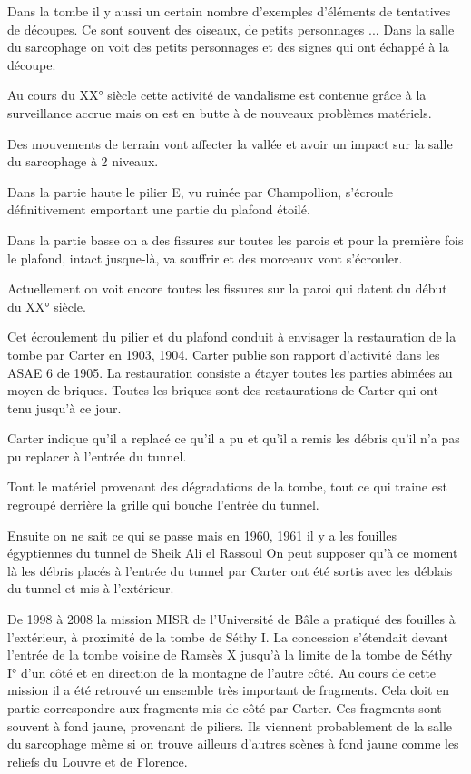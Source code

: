 \documentclass{article}
\begin{document}
Dans la tombe il y aussi un certain nombre d’exemples d’éléments de
tentatives de découpes. Ce sont souvent des oiseaux, de petits
personnages ... Dans la salle du sarcophage on voit des petits
personnages et des signes qui ont échappé à la découpe. 

Au cours du XX° siècle cette activité de vandalisme est contenue grâce à
la surveillance accrue mais on est en butte à de nouveaux problèmes
matériels.

Des mouvements de terrain vont affecter la vallée et avoir un impact sur
la salle du sarcophage à 2 niveaux. 

Dans la partie haute le pilier E, vu ruinée par Champollion, s’écroule
définitivement emportant une partie du plafond étoilé.

Dans la partie basse on a des fissures sur toutes les parois et pour la
première fois le plafond, intact jusque-là, va souffrir et des morceaux
vont s’écrouler.

Actuellement on voit encore toutes les fissures sur la paroi qui datent
du début du XX° siècle. 

Cet écroulement du pilier et du plafond conduit à envisager la
restauration de la tombe par Carter en 1903, 1904.  Carter publie son
rapport d’activité dans les ASAE 6  de 1905. La restauration consiste a
étayer toutes les parties abimées au moyen de briques. Toutes les
briques sont des restaurations de Carter qui ont tenu jusqu’à ce jour.

Carter indique qu’il a replacé ce qu’il a pu et qu’il a remis les débris
qu’il n’a pas pu replacer à l’entrée du tunnel.

Tout le matériel provenant des dégradations de la tombe, tout ce qui
traine est regroupé derrière la grille qui bouche l’entrée du tunnel.

Ensuite on ne sait ce qui se passe mais en 1960, 1961 il y a les
fouilles égyptiennes du tunnel de Sheik Ali el Rassoul On peut supposer
qu’à ce moment là les débris placés à l’entrée du tunnel par Carter ont
été sortis avec les déblais du tunnel et mis à l’extérieur. 

De 1998 à 2008 la mission MISR de l’Université de Bâle a pratiqué des
fouilles à l’extérieur, à proximité de la tombe de Séthy I. La
concession s’étendait devant l’entrée de la tombe voisine de Ramsès X
jusqu’à la limite de la tombe de Séthy I° d’un côté et en direction de
la montagne de l’autre côté. Au cours de cette mission il a été
retrouvé un ensemble très important de fragments. Cela doit en partie
correspondre aux fragments mis de côté par Carter. Ces fragments sont
souvent à fond jaune, provenant de piliers. Ils viennent probablement
de la salle du sarcophage même si on trouve ailleurs d’autres scènes à
fond jaune comme les reliefs du Louvre et de Florence.
\end{document}
